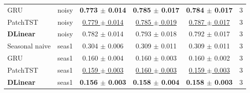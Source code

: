 \begin{tabular}{llcccc}
GRU & noisy & \textbf{0.773 $\pm$ 0.014} & \textbf{0.785 $\pm$ 0.017} & \textbf{0.784 $\pm$ 0.017} & 3 \\
PatchTST & noisy & \underline{0.779 $\pm$ 0.014} & \underline{0.785 $\pm$ 0.019} & \underline{0.787 $\pm$ 0.017} & 3 \\
\textbf{DLinear} & noisy & 0.782 $\pm$ 0.014 & 0.793 $\pm$ 0.018 & 0.792 $\pm$ 0.017 & 3 \\
\midrule
Seasonal naive & seas1 & 0.304 $\pm$ 0.006 & 0.309 $\pm$ 0.011 & 0.309 $\pm$ 0.011 & 3 \\
GRU & seas1 & 0.160 $\pm$ 0.004 & 0.160 $\pm$ 0.003 & 0.160 $\pm$ 0.002 & 3 \\
PatchTST & seas1 & \underline{0.159 $\pm$ 0.003} & \underline{0.160 $\pm$ 0.003} & \underline{0.159 $\pm$ 0.003} & 3 \\
\textbf{DLinear} & seas1 & \textbf{0.156 $\pm$ 0.003} & \textbf{0.158 $\pm$ 0.004} & \textbf{0.158 $\pm$ 0.003} & 3 \\
\bottomrule
\end{tabular}
